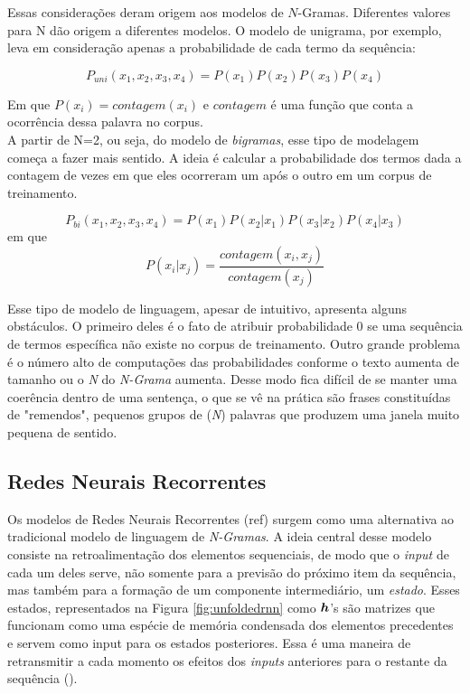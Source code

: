 Essas considerações deram origem aos modelos de $N$-Gramas. Diferentes valores para N dão origem a diferentes modelos. O modelo de unigrama, por exemplo, leva em consideração apenas a probabilidade de cada termo da sequência:

\begin{equation}
P_{uni}(x_1, x_2, x_3, x_4) = P(x_1)P(x_2)P(x_3)P(x_4)
\end{equation}

Em que $P(x_i) = contagem(x_i)$ e $contagem$ é uma função que conta a ocorrência dessa palavra no corpus.\\

A partir de N=2, ou seja, do modelo de \textit{bigramas}, esse tipo de modelagem começa a fazer mais sentido. A ideia é calcular a probabilidade dos termos dada a contagem de vezes em que eles ocorreram um após o outro em um corpus de treinamento.

\begin{equation}
P_{bi}(x_1,x_2,x_3,x_4) = P(x_1)P(x_2\vert x_1)P(x_3\vert x_2)P(x_4\vert x_3)
\end{equation} 
em que
\begin{equation}
P(x_i\vert x_j) = \frac{contagem(x_i, x_j)}{contagem(x_j)}
\end{equation}


Esse tipo de modelo de linguagem, apesar de intuitivo, apresenta alguns obstáculos. O primeiro deles é o fato de atribuir probabilidade 0 se uma sequência de termos específica não existe no corpus de treinamento. Outro grande problema é o número alto de computações das probabilidades conforme o texto aumenta de tamanho ou o \textit{N} do \textit{N-Grama} aumenta. Desse modo fica difícil de se manter uma coerência dentro de uma sentença, o que se vê na prática são frases constituídas de "remendos", pequenos grupos de (\textit{N}) palavras que produzem uma janela muito pequena de sentido.

\subsection{Redes Neurais Recorrentes}
\label{sec:RNN}

Os modelos de Redes Neurais Recorrentes (ref) surgem como uma alternativa ao tradicional modelo de linguagem de \textit{N-Gramas}. A ideia central desse modelo consiste na retroalimentação dos elementos sequenciais, de modo que o \textit{input} de cada um deles serve, não somente para a previsão do próximo item da sequência, mas também para a formação de um componente intermediário, um \textit{estado}. Esses estados, representados na Figura \ref{fig:unfoldedrnn} como $\bm{h}$'s são matrizes que funcionam como uma espécie de memória condensada dos elementos precedentes e servem como input para os estados posteriores. Essa é uma maneira de retransmitir a cada momento os efeitos dos \textit{inputs} anteriores para o restante da sequência (\cite{Goodfellow-et-al-2016}). 

